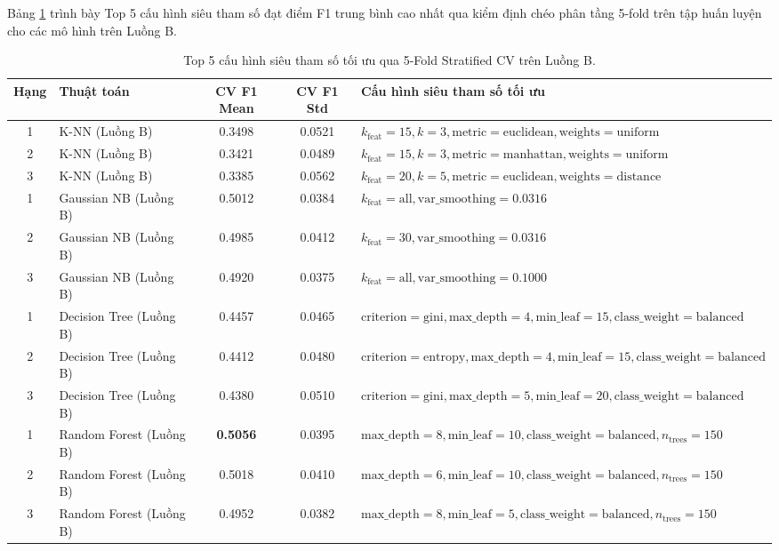 \documentclass[12pt,a4paper]{article}
\begin{document}
Bảng \ref{tab:top5_cv} trình bày Top 5 cấu hình siêu tham số đạt điểm F1 trung bình cao nhất qua kiểm định chéo phân tầng 5-fold trên tập huấn luyện cho các mô hình trên Luồng B.

\begin{table}[H]
\centering
\caption{Top 5 cấu hình siêu tham số tối ưu qua 5-Fold Stratified CV trên Luồng B.}
\label{tab:top5_cv}
\small
\begin{tabular}{|c|l|c|c|p{7.5cm}|}
\hline
\textbf{Hạng} & \textbf{Thuật toán} & \textbf{CV F1 Mean} & \textbf{CV F1 Std} & \textbf{Cấu hình siêu tham số tối ưu} \\
\hline
1 & K-NN (Luồng B) & 0.3498 & 0.0521 & $k_{\text{feat}}=15, k=3, \text{metric}=\text{euclidean}, \text{weights}=\text{uniform}$ \\
\hline
2 & K-NN (Luồng B) & 0.3421 & 0.0489 & $k_{\text{feat}}=15, k=3, \text{metric}=\text{manhattan}, \text{weights}=\text{uniform}$ \\
\hline
3 & K-NN (Luồng B) & 0.3385 & 0.0562 & $k_{\text{feat}}=20, k=5, \text{metric}=\text{euclidean}, \text{weights}=\text{distance}$ \\
\hline
1 & Gaussian NB (Luồng B) & 0.5012 & 0.0384 & $k_{\text{feat}}=\text{all}, \text{var\_smoothing}=0.0316$ \\
\hline
2 & Gaussian NB (Luồng B) & 0.4985 & 0.0412 & $k_{\text{feat}}=30, \text{var\_smoothing}=0.0316$ \\
\hline
3 & Gaussian NB (Luồng B) & 0.4920 & 0.0375 & $k_{\text{feat}}=\text{all}, \text{var\_smoothing}=0.1000$ \\
\hline
1 & Decision Tree (Luồng B) & 0.4457 & 0.0465 & $\text{criterion}=\text{gini}, \text{max\_depth}=4, \text{min\_leaf}=15, \text{class\_weight}=\text{balanced}$ \\
\hline
2 & Decision Tree (Luồng B) & 0.4412 & 0.0480 & $\text{criterion}=\text{entropy}, \text{max\_depth}=4, \text{min\_leaf}=15, \text{class\_weight}=\text{balanced}$ \\
\hline
3 & Decision Tree (Luồng B) & 0.4380 & 0.0510 & $\text{criterion}=\text{gini}, \text{max\_depth}=5, \text{min\_leaf}=20, \text{class\_weight}=\text{balanced}$ \\
\hline
1 & Random Forest (Luồng B) & \textbf{0.5056} & 0.0395 & $\text{max\_depth}=8, \text{min\_leaf}=10, \text{class\_weight}=\text{balanced}, n_{\text{trees}}=150$ \\
\hline
2 & Random Forest (Luồng B) & 0.5018 & 0.0410 & $\text{max\_depth}=6, \text{min\_leaf}=10, \text{class\_weight}=\text{balanced}, n_{\text{trees}}=150$ \\
\hline
3 & Random Forest (Luồng B) & 0.4952 & 0.0382 & $\text{max\_depth}=8, \text{min\_leaf}=5, \text{class\_weight}=\text{balanced}, n_{\text{trees}}=150$ \\
\hline
\end{tabular}
\end{table}
\end{document}
